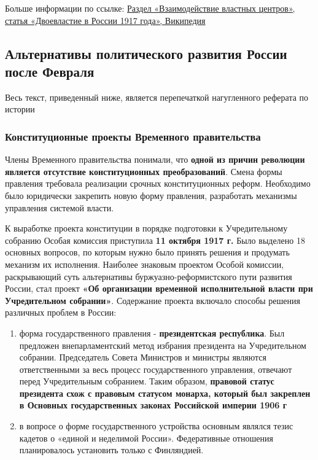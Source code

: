 \documentclass{article}
\newenvironment{important}[1][]{%
   \begin{mdframed}[%
      backgroundcolor={red!15}, hidealllines=true,
      skipabove=0.7\baselineskip, skipbelow=0.7\baselineskip,
      splitbottomskip=2pt, splittopskip=4pt, #1]%
   \makebox[0pt]{%
      \smash{%
         \fontsize{32pt}{32pt}\selectfont%
         \hspace*{-19pt}%
         \raisebox{-2pt}{%
            {\color{red!70!black}\sffamily\bfseries !}%
         }%
      }%
   }%
}{\end{mdframed}}
\begin{document}
Больше информации по ссылке: \href{https://ru.wikipedia.org/wiki/%D0%94%D0%B2%D0%BE%D0%B5%D0%B2%D0%BB%D0%B0%D1%81%D1%82%D0%B8%D0%B5_%D0%B2_%D0%A0%D0%BE%D1%81%D1%81%D0%B8%D0%B8_1917_%D0%B3%D0%BE%D0%B4%D0%B0#%D0%92%D0%B7%D0%B0%D0%B8%D0%BC%D0%BE%D0%B4%D0%B5%D0%B9%D1%81%D1%82%D0%B2%D0%B8%D0%B5%20%D0%B2%D0%BB%D0%B0%D1%81%D1%82%D0%BD%D1%8B%D1%85%20%D1%86%D0%B5%D0%BD%D1%82%D1%80%D0%BE%D0%B2}{Раздел «Взаимодействие властных центров», статья «Двоевластие в России 1917 года», Википедия}

\pagebreak
\subsection{Альтернативы политического развития России после Февраля}

\begin{important}
    Весь текст, приведенный ниже, является перепечаткой нагугленного реферата по истории
\end{important}

\subsubsection{Конституционные проекты Временного правительства}

Члены Временного правительства понимали, что \textbf{одной из причин революции является отсутствие конституционных преобразований}. Смена формы правления требовала реализации срочных конституционных реформ. Необходимо было юридически закрепить новую форму правления, разработать механизмы управления системой власти.

\hfill
К выработке проекта конституции в порядке подготовки к Учредительному собранию Особая комиссия приступила \textbf{11 октября 1917 г.} Было выделено 18 основных вопросов, по которым нужно было принять решения и продумать механизм их исполнения. Наиболее знаковым проектом Особой комиссии, раскрывающий суть альтернативы буржуазно-реформистского пути развития России, стал проект \textbf{«Об организации временной исполнительной власти при Учредительном собрании»}. Содержание проекта включало способы решения различных проблем в России:

\begin{enumerate}
    \item форма государственного правления - \textbf{президентская республика}. Был предложен внепарламентский метод избрания президента на Учредительном собрании. Председатель Совета Министров и министры являются ответственными за весь процесс государственного управления, отвечают перед Учредительным собранием. Таким образом, \textbf{правовой статус президента схож с правовым статусом монарха, который был закреплен в Основных государственных законах Российской империи 1906 г}
    \item в вопросе о форме государственного устройства основным являлся тезис кадетов о «единой и неделимой России». Федеративные отношения планировалось установить только с Финляндией.
\end{enumerate}
\end{document}
